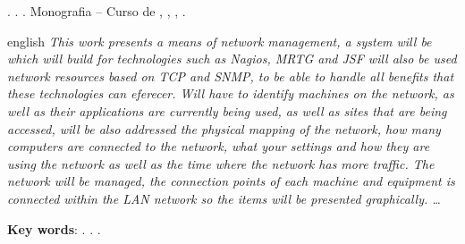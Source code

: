 
\begin{OnehalfSpacing} 

\noindent \imprimirAutorCitacaoMaiuscula. {\bfseries\imprimirtitulo}. {\imprimirdata}.  Monografia -- Curso de {\MakeUppercase\imprimircurso}, {\imprimirinstituicao}, {\imprimirlocal}, {\imprimirdata}.

\vspace{\onelineskip}
\vspace{\onelineskip}
\vspace{\onelineskip}
\vspace{\onelineskip}

\begin{resumo}[Abstract]%
\begin{otherlanguage*}{english}%
\textit{
\noindent This work presents a means of network management, a system will be 
which will build for technologies such as Nagios, MRTG and JSF will also be 
used network resources based on TCP and SNMP, to be able to handle all 
benefits that these technologies can eferecer. 
Will have to identify machines on the network, as well as their applications 
are currently being used, as well as sites that are being accessed, 
will be also addressed the physical mapping of the network, how many computers are 
connected to the network, what your settings and how they are using the 
network as well as the time where the network has more traffic. 
The network will be managed, the connection points of each machine and equipment 
is connected within the LAN network so the items will be presented 
graphically. 
\ldots
}

\vspace{\onelineskip}
\vspace*{\fill}
\noindent \textbf{Key words}: \imprimirKeyWordOne. \imprimirKeyWordTwo. \imprimirKeyWordThree.
\end{otherlanguage*}
\vspace{\onelineskip}
\end{resumo}

\end{OnehalfSpacing}
